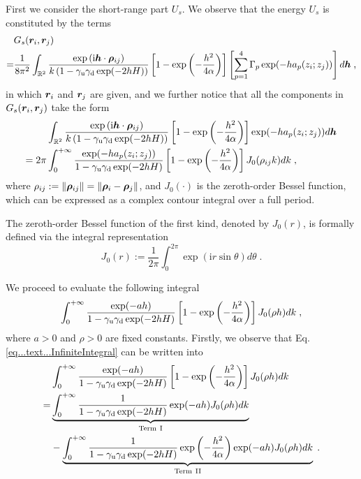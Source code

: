 First we consider the short-range part $U_s$.
We observe that the energy $U_s$ is constituted by the terms
\begin{align*}
  &G_s(\boldsymbol{r}_i, \boldsymbol{r}_j)\\
   =& \frac{1}{8\pi^2 }\int_{\mathbb{R}^2} \frac{ \exp{(\mathrm{i} \boldsymbol{h} \cdot \boldsymbol{\rho}_{ij})}}{k\left(1-\gamma_{\mathrm{u}}\gamma_{\mathrm{d}}\exp(-2hH)\right)} \left[1-\exp\left(-\frac{h^2}{4\alpha}\right)\right]\left[\sum_{p=1}^4\Gamma_p\exp(-ha_p(z_i;z_j))\right]d \boldsymbol{h}\;,  
\end{align*}
in which $\bm{r}_i$ and $\bm{r}_j$ are given, and we further notice  that all the components in $G_s(\boldsymbol{r}_i, \boldsymbol{r}_j)$ take the form
\begin{equation}\label{eq::int_Gs}
    \begin{split}
        & \int_{\mathbb{R}^2} \frac{ \exp{(\mathrm{i} \boldsymbol{h} \cdot \boldsymbol{\rho}_{ij})}}{k\left(1-\gamma_{\mathrm{u}}\gamma_{\mathrm{d}}\exp(-2hH)\right)} \left[1-\exp\left(-\frac{h^2}{4\alpha}\right)\right]\exp(-ha_p(z_i;z_j))d \boldsymbol{h}\\
        =2\pi&\int_0^{+\infty} \frac{ \exp(-ha_p(z_i;z_j))}{1-\gamma_{\mathrm{u}}\gamma_{\mathrm{d}}\exp(-2hH)} \left[1-\exp\left(-\frac{h^2}{4\alpha}\right)\right] J_0(\rho_{ij}k)d k\;,
    \end{split}
\end{equation}
where $\rho_{ij}:=\left\lVert\bm{\rho}_{ij}\right\rVert=\left\lVert\bm{\rho}_i-\bm{\rho}_j\right\rVert$, and $ J_0(\cdot)$ is the zeroth-order Bessel function,  which  can   be expressed as a complex contour integral over a full period.
\begin{defination}
    The zeroth-order Bessel function of the first kind, denoted by $ J_0(r)$, is formally defined via the integral representation
\begin{equation}
       J_0(r):=\frac{1}{2\pi} \int_0^{2\pi} \exp(\mathrm{i} r\sin \theta) d \theta\;.  
    \end{equation}
\end{defination}
We proceed to evaluate the following integral
\begin{equation}\label{eq...text...InfiniteIntegral}
\int_0^{+\infty} \frac{ \exp(-ah)}{1-\gamma_{\mathrm{u}}\gamma_{\mathrm{d}}\exp(-2hH)} \left[1-\exp\left(-\frac{h^2}{4\alpha}\right)\right] J_0(\rho h)d k\;,    
\end{equation}
where $a>0$ and $\rho>0$ are fixed constants. Firstly, we observe that Eq. \eqref{eq...text...InfiniteIntegral} can be written into
\begin{align*}
   & \int_0^{+\infty} \frac{ \exp(-ah)}{1-\gamma_{\mathrm{u}}\gamma_{\mathrm{d}}\exp(-2hH)} \left[1-\exp\left(-\frac{h^2}{4\alpha}\right)\right] J_0(\rho h)d k\\
   =&\underbrace{\int_0^{+\infty} \frac{1}{1-\gamma_{\mathrm{u}}\gamma_{\mathrm{d}}\exp(-2hH)}  \exp(-ah)  J_0(\rho h)d k}_{\text{Term}~\mathrm{I}}\\
   &-\underbrace{\int_0^{+\infty} \frac{1}{1-\gamma_{\mathrm{u}}\gamma_{\mathrm{d}}\exp(-2hH)}\exp\left(-\frac{h^2}{4\alpha}\right)  \exp(-ah)  J_0(\rho h)d k}_{\text{Term}~\mathrm{II}}\;.
\end{align*}
